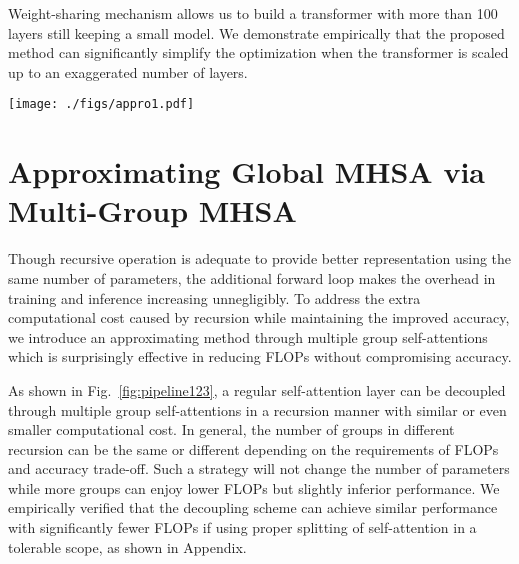 \documentclass[runningheads]{llncs}
\begin{document}
	 Weight-sharing mechanism allows us to build a transformer with more than 100 layers still keeping a small model. We demonstrate empirically that the proposed method can significantly simplify the optimization when the transformer is scaled up to an exaggerated number of layers. 
	
	\begin{figure*}[t]
		\centering
		\texttt{[image: ./figs/appro1.pdf]} 
		\caption{Approximating global MHSA via sliced group MHSA with permutation.}
		\label{fig:pipeline123} 
	\end{figure*}
	
	\section{Approximating Global MHSA via Multi-Group MHSA} \label{approximating}
	
	Though recursive operation is adequate to provide better representation using the same number of parameters, the additional forward loop makes the overhead in training and inference increasing unnegligibly. To address the extra computational cost caused by recursion while maintaining the improved accuracy, we introduce an approximating method through multiple group self-attentions which is surprisingly effective in reducing FLOPs without compromising accuracy.
	
	 As shown in Fig.~\ref{fig:pipeline123}, a regular self-attention layer can be decoupled through multiple group self-attentions in a recursion manner with similar or even smaller computational cost. In general, the number of groups in different recursion can be the same or different depending on the requirements of FLOPs and accuracy trade-off. Such a strategy will not change the number of parameters while more groups can enjoy lower FLOPs but slightly inferior performance. We empirically verified that the decoupling scheme can achieve similar performance with significantly fewer FLOPs if using proper splitting of self-attention in a tolerable scope, as shown in Appendix.
	
\end{document}
